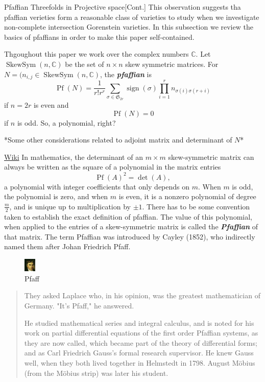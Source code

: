 \begin{thing4}{Pfaffian Threefolds in Projective space}[Cont.]\leavevmode
	This observation suggests tha pfaffian verieties form a reasonable class of varieties to study when we investigate non-complete intersection Gorenstein varieties. In this subsection we review the basics of pfaffians in order to make this paper self-contained.
\end{thing4}

Thgoughout this paper we work over the complex numbers $\mathbb{C}$. Let $\operatorname{SkewSym}(n,\mathbb{C})$ be the set of $n\times n$ skew symmetric matrices. For $N=(n_{i,j}\in\operatorname{SkewSym}(n,\mathbb{C})$, the \textit{\textbf{pfaffian}} is
 \[\operatorname{Pf}(N)=\frac{1}{r!r^r}\sum_{\sigma\in\mathfrak{S}_{2r}}\operatorname{sign}(\sigma) \prod_{i=1}^rn_{\sigma(i)\sigma(r+i)}  \]
 if $n=2r$ is even and 
  \[\operatorname{Pf}(N)=0\]
  if $n$ is odd. {\color{persimmon}So, a polynomial, right?}

*Some other considerations related to adjoint matrix and determinant of $N$*

\begin{thing2}{\href{https://en.wikipedia.org/wiki/Pfaffian}{Wiki}}\leavevmode
	In mathematics, the determinant of an  $m\times m$ skew-symmetric matrix can always be written as the square of a polynomial in the matrix entries
	\[\operatorname{Pf}(A)^2=\det(A),\]
a polynomial with integer coefficients that only depends on $m$. When $m$ is odd, the polynomial is zero, and when $m$ is even, it is a nonzero polynomial of degree $\frac{m}{2}$, and is unique up to multiplication by $\pm 1$. {\color{persimmon}There has to be some convention taken to establish the exact definition of pfaffian.} The value of this polynomial, when applied to the entries of a skew-symmetric matrix is called the \textit{\textbf{Pfaffian}} of that matrix. The term Pfaffian was introduced by Cayley (1852), who indirectly named them after Johan Friedrich Pfaff.
\begin{figure}[H]
	\centering\hfill
	\includegraphics[width=0.05\textwidth]{fig2.png}
	\caption*{\hfill {\tiny Pfaff}}
\end{figure}
\begin{quotation}
	They asked Laplace who, in his opinion, was the greatest mathematician of Germany. "It's Pfaff," he answered.

	He studied mathematical series and integral calculus, and is noted for his work on partial differential equations of the first order Pfaffian systems, as they are now called, which became part of the theory of differential forms; and as Carl Friedrich Gauss's formal research supervisor. He knew Gauss well, when they both lived together in Helmstedt in 1798. August Möbius (from the Möbius strip) was later his student.
\end{quotation}
\end{thing2}

